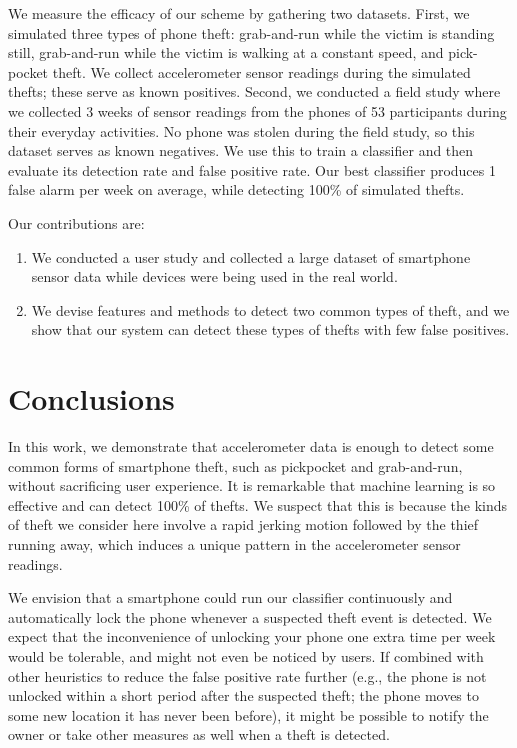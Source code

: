 We measure the efficacy of our scheme by gathering two datasets.
First, we simulated three types of phone theft: grab-and-run while the victim is standing still, grab-and-run while the victim is walking at a constant speed, and pick-pocket theft.
We collect accelerometer sensor readings during the simulated thefts; these serve as known positives.
Second, we conducted a field study where we collected 3 weeks of sensor readings from the phones of 53 participants during their everyday activities.
No phone was stolen during the field study, so this dataset serves as known negatives.
We use this to train a classifier and then evaluate its detection rate and false positive rate.
Our best classifier produces 1 false alarm per week on average, while detecting 100\% of simulated thefts.


Our contributions are:
\begin{enumerate}
  \item We conducted a user study and collected a large dataset of smartphone sensor data while devices were being used in the real world.
  \item We devise features and methods to detect two common types of theft, and we show that our system can detect these types of thefts with few false positives.
\end{enumerate}


% 
% 

\section{Conclusions}

In this work, we demonstrate that accelerometer data is enough to detect some common forms of smartphone theft, such as pickpocket and grab-and-run, without sacrificing user experience. 
It is remarkable that machine learning is so effective and can detect 100\% of thefts.
We suspect that this is because the kinds of theft we consider here involve a rapid jerking motion followed by the thief running away, which induces a unique pattern in the accelerometer sensor readings.

We envision that a smartphone could run our classifier continuously and automatically lock the phone whenever a suspected theft event is detected.
We expect that the inconvenience of unlocking your phone one extra time per week would be tolerable, and might not even be noticed by users.
If combined with other heuristics to reduce the false positive rate further (e.g., the phone is not unlocked within a short period after the suspected theft; the phone moves to some new location it has never been before), it might be possible to notify the owner or take other measures as well when a theft is detected.

